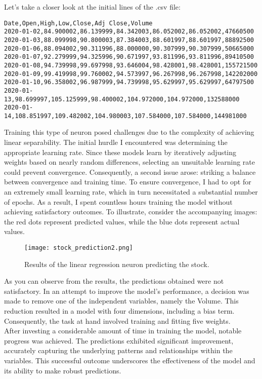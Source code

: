 Let's take a closer look at the initial lines of the .csv file:
\begin{verbatim}
Date,Open,High,Low,Close,Adj Close,Volume
2020-01-02,84.900002,86.139999,84.342003,86.052002,86.052002,47660500
2020-01-03,88.099998,90.800003,87.384003,88.601997,88.601997,88892500
2020-01-06,88.094002,90.311996,88.000000,90.307999,90.307999,50665000
2020-01-07,92.279999,94.325996,90.671997,93.811996,93.811996,89410500
2020-01-08,94.739998,99.697998,93.646004,98.428001,98.428001,155721500
2020-01-09,99.419998,99.760002,94.573997,96.267998,96.267998,142202000
2020-01-10,96.358002,96.987999,94.739998,95.629997,95.629997,64797500
2020-01-13,98.699997,105.125999,98.400002,104.972000,104.972000,132588000
2020-01-14,108.851997,109.482002,104.980003,107.584000,107.584000,144981000
\end{verbatim}
Training this type of neuron posed challenges due to the complexity of achieving linear separability.
The initial hurdle I encountered was determining the appropriate learning rate. Since these models learn by
iteratively adjusting weights based on nearly random differences, selecting an unsuitable learning rate could
prevent convergence. Consequently, a second issue arose: striking a balance between convergence and training
time. To ensure convergence, I had to opt for an extremely small learning rate, which in turn necessitated a
substantial number of epochs. As a result, I spent countless hours training the model without achieving
satisfactory outcomes. To illustrate, consider the accompanying images: the red dots represent predicted
values, while the blue dots represent actual values.

\begin{figure}[H]
  \centering
  \texttt{[image: stock\_prediction2.png]}
  \caption{Results of the linear regression neuron predicting the stock.}
\end{figure}

As you can observe from the results, the predictions obtained were not satisfactory. In an attempt to improve
the model's performance, a decision was made to remove one of the independent variables, namely the Volume.
This reduction resulted in a model with four dimensions, including a bias term. Consequently, the task at
hand involved training and fitting five weights.\\

After investing a considerable amount of time in training the model, notable progress was achieved. The
predictions exhibited significant improvement, accurately capturing the underlying patterns and relationships
within the variables. This successful outcome underscores the effectiveness of the model and its ability to
make robust predictions.

